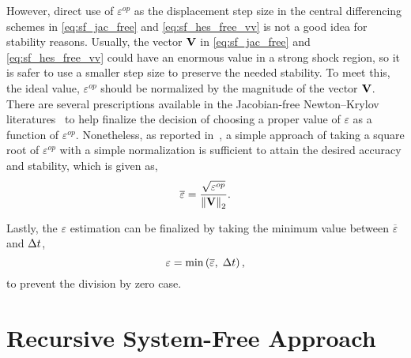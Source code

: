 However, direct use of \( \varepsilon^{op} \) as
the displacement step size in the central differencing schemes
in \cref{eq:sf_jac_free} and \cref{eq:sf_hes_free_vv}
is not a good idea for stability reasons.
%
Usually, the vector \( \mathbf{V} \) in
\cref{eq:sf_jac_free} and \cref{eq:sf_hes_free_vv} could have an
enormous value in a strong shock region, so it is safer to use
a smaller step size to preserve the needed stability. To meet this,
the ideal value, \( \varepsilon^{op} \) should be normalized
by the magnitude of the vector \( \mathbf{V} \).
%
There are several prescriptions available
in the Jacobian-free Newton–Krylov 
literatures~\cite{knoll2004jacobian, brown1990hybrid}
to help finalize the decision of choosing a proper value of \( \varepsilon \)
as a function of  \( \varepsilon^{op} \).
%
Nonetheless, as reported in~\cite{lee2021single},
a simple approach of
taking a square root of \( \varepsilon^{op} \)
with a simple normalization is sufficient to attain the desired accuracy and stability,
which is given as,
%
\begin{equation}\label{eq:sf_epsilon_norm}
    \overline{\varepsilon} = \frac{\sqrt{\varepsilon^{op}}}{\left\lVert \mathbf{V} \right\rVert_{2}}.
\end{equation}

Lastly,
the \( \varepsilon \) estimation can be finalized
by taking the minimum value between $\overline{\varepsilon}$ and $\Delta t$,
%
\begin{equation}\label{eq:sf_epsilon_min_dt}
    \varepsilon = \min \left( \overline{\varepsilon}, \; \Delta t  \right),
\end{equation}
to prevent the division by zero case.


\section{Recursive System-Free Approach}\label{sec:recursive_sf}
